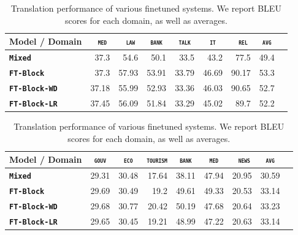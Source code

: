\documentclass[11pt,a4paper]{article}
\newcommand{\domain}[1]{\texttt{\textsc{#1}}}
\newcommand{\system}[1]{\texttt{\textbf{#1}}}
\begin{document}
\begin{table}[htbp]
  \centering
  \begin{tabular}{|p{3cm}|*{8}{r|}} \hline
    Model / Domain & \multicolumn{1}{c|}{\domain{ med}} & \multicolumn{1}{c|}{\domain{ law}} & \multicolumn{1}{c|}{\domain{bank}} & \multicolumn{1}{c|}{\domain{talk}} & \multicolumn{1}{c|}{\domain{ it }} & \multicolumn{1}{c|}{\domain{ rel}} & \multicolumn{1}{c|}{\domain{avg}} \\ \hline %
    \system{Mixed}  & 37.3 & 54.6 & 50.1 & 33.5 & 43.2 & 77.5  & 49.4 \\
   \system{FT-Block}     & 37.3	& 57.93 &	53.91 &	33.79 &	46.69 &	90.17 & 53.3 \\ 
   \system{FT-Block-WD}     & 37.18 & 55.99 & 52.93 & 33.36 & 46.03 & 90.65 & 52.7 \\
   \system{FT-Block-LR}     & 37.45 & 56.09 & 51.84 & 33.29 & 45.02 & 89.7 & 52.2 \\
     \hline
  \end{tabular}
  \caption{Translation performance of various finetuned systems. We report BLEU scores for each domain, as well as averages.}
  \label{tab:performance-en-fr-reg}
\end{table}

\begin{table}[htbp]
  \centering
  \begin{tabular}{|p{3cm}|*{8}{r|}} \hline
    Model / Domain & \multicolumn{1}{c|}{\domain{gouv}} & \multicolumn{1}{c|}{\domain{eco}} & \multicolumn{1}{c|}{\domain{tourism}} & \multicolumn{1}{c|}{\domain{bank}} & \multicolumn{1}{c|}{\domain{ med }} & \multicolumn{1}{c|}{\domain{ news}} & \multicolumn{1}{c|}{\domain{avg}} \\ \hline %
    \system{Mixed}  & 29.31 & 30.48 & 17.64 & 38.11 & 47.94 & 20.95  & 30.59 \\
   \system{FT-Block} & 29.69 &	30.49 &	19.2 &	49.61 &	49.33 &	20.53 &	33.14     \\
   \system{FT-Block-WD}     & 29.68 & 30.77 & 20.42 & 50.19 & 47.68 & 20.64 & 33.23 \\
   \system{FT-Block-LR}     & 29.65 & 30.45 & 19.21 & 48.99 & 47.22 & 20.63 & 33.14 \\ 
     \hline
  \end{tabular}
  \caption{Translation performance of various finetuned systems. We report BLEU scores for each domain, as well as averages.}
  \label{tab:performance-en-de-reg}
\end{table}
\end{document}
